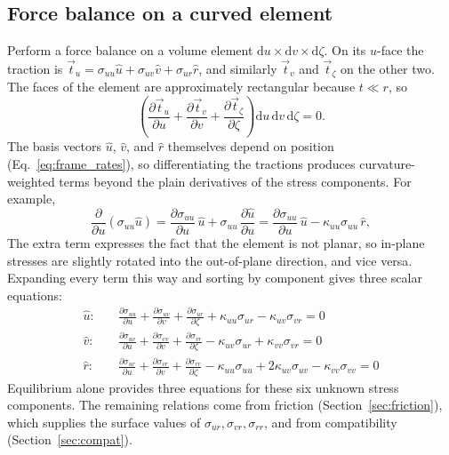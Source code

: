 \documentclass[11pt]{article}
\begin{document}
\subsection{Force balance on a curved element}\label{sec:force_balance}
Perform a force balance on a volume element
$\mathrm du \times \mathrm dv \times \mathrm d\zeta$. On its $u$-face the
traction is $\vec t_u = \sigma_{uu}\hat u + \sigma_{uv}\hat v
+ \sigma_{ur}\hat r$, and similarly $\vec t_v$ and $\vec t_\zeta$ on the other
two. The faces of the element are approximately rectangular because $t \ll r$, so
\begin{equation}\label{eq:net_force}
    \left(\frac{\partial \vec t_u}{\partial u}
      + \frac{\partial \vec t_v}{\partial v}
      + \frac{\partial \vec t_\zeta}{\partial \zeta}\right)
    \mathrm du\,\mathrm dv\,\mathrm d\zeta = 0.
\end{equation}
The basis vectors $\hat u$, $\hat v$, and $\hat r$ themselves depend on position (Eq.~\ref{eq:frame_rates}), so
differentiating the tractions produces curvature-weighted terms beyond the plain
derivatives of the stress components. For example,
\begin{equation}\label{eq:example_term}
    \frac{\partial}{\partial u}\left(\sigma_{uu}\hat u\right)
    = \frac{\partial \sigma_{uu}}{\partial u}\,\hat u
      + \sigma_{uu}\,\frac{\partial \hat u}{\partial u}
    = \frac{\partial \sigma_{uu}}{\partial u}\,\hat u
      - \kappa_{uu}\sigma_{uu}\,\hat r,
\end{equation}
The extra term expresses the fact that the element is not planar, so in-plane stresses are slightly rotated into the out-of-plane direction, and vice versa.  Expanding every term this way and sorting by component gives three scalar equations:
\begin{align}
    \hat u: \quad &\boxed{\frac{\partial \sigma_{uu}}{\partial u}
      + \frac{\partial \sigma_{uv}}{\partial v}
      + \frac{\partial \sigma_{ur}}{\partial \zeta}
      + \kappa_{uu}\sigma_{ur} - \kappa_{uv}\sigma_{vr} = 0}
      \label{eq:eq_u}\\
    \hat v: \quad &\boxed{\frac{\partial \sigma_{uv}}{\partial u}
      + \frac{\partial \sigma_{vv}}{\partial v}
      + \frac{\partial \sigma_{vr}}{\partial \zeta}
      - \kappa_{uv}\sigma_{ur} + \kappa_{vv}\sigma_{vr} = 0}
      \label{eq:eq_v}\\
    \hat r: \quad &\boxed{\frac{\partial \sigma_{ur}}{\partial u}
      + \frac{\partial \sigma_{vr}}{\partial v}
      + \frac{\partial \sigma_{rr}}{\partial \zeta}
      - \kappa_{uu}\sigma_{uu} + 2\kappa_{uv}\sigma_{uv}
      - \kappa_{vv}\sigma_{vv} = 0}
      \label{eq:eq_r}
\end{align}
Equilibrium alone provides three equations for these six unknown stress components. The remaining
relations come from friction (Section~\ref{sec:friction}), which supplies the
surface values of $\sigma_{ur},\sigma_{vr},\sigma_{rr}$, and from compatibility
(Section~\ref{sec:compat}).
\end{document}
